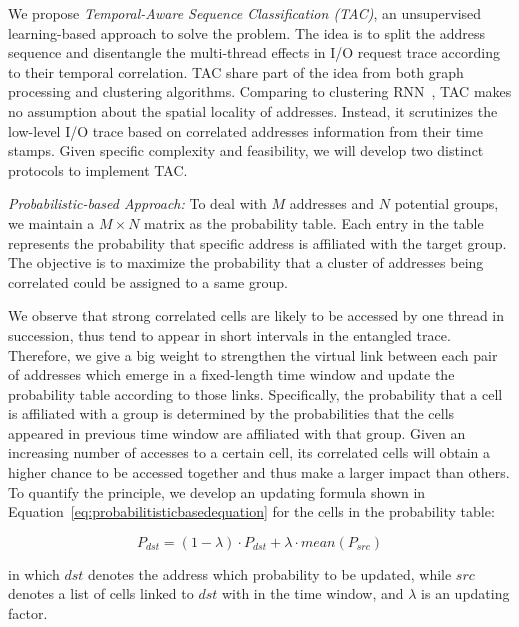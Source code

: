 We propose \emph{Temporal-Aware Sequence Classification (TAC)},
an unsupervised learning-based approach to solve the problem.
The idea is to split the address sequence
and disentangle the multi-thread effects in I/O request trace
according to their temporal correlation.
TAC share part of the idea from both graph processing and clustering algorithms.
Comparing to clustering RNN~\cite{hashemi2018learning},
TAC makes no assumption about the spatial locality of addresses.
Instead, it scrutinizes the low-level I/O trace based on correlated addresses
information from their time stamps.
\iffalse
Given specific complexity and feasibility,
we will develop two distinct protocols to implement TAC.

\emph{Probabilistic-based Approach:}
To deal with $M$ addresses and $N$ potential groups, we maintain a $M\times N$ matrix
as the probability table.
Each entry in the table represents the probability that specific address is
affiliated with the target group.
The objective is to maximize the probability that a cluster of addresses being
correlated could be assigned to a same group.

We observe that strong correlated cells are likely to be accessed
by one thread in succession, thus tend to appear in short intervals
in the entangled trace.
Therefore, we give a big weight to strengthen the virtual link
between each pair of addresses which emerge in a fixed-length time window
and update the probability table according to those links.
Specifically, the probability that a cell is affiliated with a group is determined by the probabilities that the cells appeared in previous time window are affiliated with that group.
Given an increasing number of accesses to a certain cell,
its correlated cells will obtain a higher chance to be accessed together
and thus make a larger impact than others.
To quantify the principle, we develop an updating formula shown in Equation~\ref{eq:probabilitisticbasedequation} for the cells in the probability table:

\begin{equation}
\label{eq:probabilitisticbasedequation}
P_{dst} = (1 - \lambda) \cdot P_{dst} + \lambda \cdot mean(P_{src})
\end{equation}

in which $dst$ denotes the address which probability to be updated,
while $src$ denotes a list of cells linked to $dst$ with in the time window, and $\lambda$ is an updating factor.

